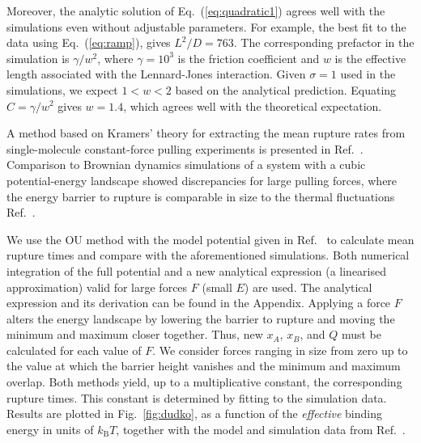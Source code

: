 \documentclass[twocolumn,pre,aps,showpacs,a4paper,floatfix,amssymb]{revtex4-1}
\newcommand{\refeq}[1]{Eq.~(\ref{#1})}
\newcommand{\refig}[1]{Fig.~\ref{#1}}
\newcommand{\xmin}{{x_\mathrm{min}}}
\newcommand{\xmax}{{x_\mathrm{max}}}
\begin{document}
Moreover, the analytic solution of \refeq{eq:quadratic1} agrees well with the simulations even without adjustable parameters.
For example, the best fit to the data using \refeq{eq:ramp}, gives $L^2/D=763$.
The corresponding prefactor in the simulation is $\gamma/w^2$,
where $\gamma=10^3$ is the friction coefficient and $w$ is the effective length associated with the Lennard-Jones interaction.
Given $\sigma=1$ used in the simulations, we expect $1< w<2$ based on the analytical prediction.
Equating $C= \gamma/w^2$ gives $w=1.4$, which agrees well with the theoretical expectation.

A method based on Kramers' theory for extracting the mean rupture rates from single-molecule constant-force pulling experiments is presented in Ref.~\cite{dudko2006intrinsic}. Comparison to Brownian dynamics simulations of a system with a cubic potential-energy landscape showed discrepancies for large pulling forces, where the energy barrier to rupture is comparable in size to the thermal fluctuations Ref.~\cite{dudko2006intrinsic}.

We use the OU method with the model potential given in Ref.~\cite{dudko2006intrinsic} to calculate mean rupture times and compare with the aforementioned simulations. Both numerical integration of the full potential and a new analytical expression (a linearised approximation) valid for large forces $F$ (small $E$) are used. The analytical expression and its derivation can be found in the Appendix.
Applying a force $F$ alters the energy landscape by lowering the barrier to rupture and moving the minimum and maximum closer together. Thus, new $x_A$, $x_B$, and $Q$ must be calculated for each value of $F$. We consider forces ranging in size from zero up to the value at which the barrier height vanishes and the minimum and maximum overlap.
Both methods yield, up to a multiplicative constant, the corresponding rupture times. 
This constant is determined by fitting to the simulation data.
Results are plotted in \refig{fig:dudko}, as a function of the \textit{effective} binding energy in units of $k_\text{B}T$, 
together with the model and simulation data from Ref.~\cite{dudko2006intrinsic}.

\end{document}
